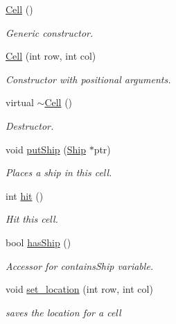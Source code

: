 \begin{DoxyCompactItemize}
\item 
\mbox{\label{classCell_a394510643e8664cf12b5efaf5cb99f71}} 
\mbox{\hyperlink{classCell_a394510643e8664cf12b5efaf5cb99f71}{Cell}} ()
\begin{DoxyCompactList}\small\item\em Generic constructor. \end{DoxyCompactList}\item 
\mbox{\label{classCell_ab0cc6ebedb16ca07d5058835684474e2}} 
\mbox{\hyperlink{classCell_ab0cc6ebedb16ca07d5058835684474e2}{Cell}} (int row, int col)
\begin{DoxyCompactList}\small\item\em Constructor with positional arguments. \end{DoxyCompactList}\item 
\mbox{\label{classCell_a1e6408c1546e13a9e91a291867f43eec}} 
virtual \mbox{\hyperlink{classCell_a1e6408c1546e13a9e91a291867f43eec}{$\sim$\+Cell}} ()
\begin{DoxyCompactList}\small\item\em Destructor. \end{DoxyCompactList}\item 
void \mbox{\hyperlink{classCell_a853a0bd48cfa519ae240a474059bc0c1}{put\+Ship}} (\mbox{\hyperlink{classShip}{Ship}} $\ast$ptr)
\begin{DoxyCompactList}\small\item\em Places a ship in this cell. \end{DoxyCompactList}\item 
int \mbox{\hyperlink{classCell_a0c8236d4cbfbc4172d2bd2fe00f7540d}{hit}} ()
\begin{DoxyCompactList}\small\item\em Hit this cell. \end{DoxyCompactList}\item 
\mbox{\label{classCell_a8362eba494760f99f6126a8a2f128834}} 
bool \mbox{\hyperlink{classCell_a8362eba494760f99f6126a8a2f128834}{has\+Ship}} ()
\begin{DoxyCompactList}\small\item\em Accessor for contains\+Ship variable. \end{DoxyCompactList}\item 
\mbox{\label{classCell_ac853179f8288b70e7b6a9cbb6033d2c8}} 
void \mbox{\hyperlink{classCell_ac853179f8288b70e7b6a9cbb6033d2c8}{set\+\_\+location}} (int row, int col)
\begin{DoxyCompactList}\small\item\em saves the location for a cell \end{DoxyCompactList}\end{DoxyCompactItemize}


